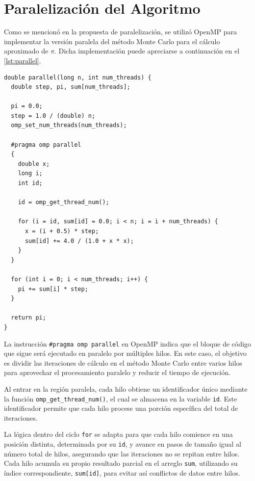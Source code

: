 \documentclass[a4paper, 10pt, onecolumn]{IEEEtran}
\begin{document}
\section{Paralelización del Algoritmo}
Como se mencionó en la propuesta de paralelización, se utilizó OpenMP para implementar la versión paralela del método Monte Carlo para el cálculo aproximado de $\pi$. Dicha implementación puede apreciarse a continuación en el \cref{lst:parallel}.

\begin{lstlisting}[caption={Implementación Paralela de Monte Carlo en C++}, label={lst:parallel}]
double parallel(long n, int num_threads) {
  double step, pi, sum[num_threads];
  
  pi = 0.0;
  step = 1.0 / (double) n;
  omp_set_num_threads(num_threads);
  
  #pragma omp parallel
  {
    double x;
    long i;
    int id;
    
    id = omp_get_thread_num();
    
    for (i = id, sum[id] = 0.0; i < n; i = i + num_threads) {
      x = (i + 0.5) * step;
      sum[id] += 4.0 / (1.0 + x * x);
    }
  }
  
  for (int i = 0; i < num_threads; i++) {
    pi += sum[i] * step;
  }
  
  return pi;
}
\end{lstlisting}

La instrucción \texttt{\#pragma omp parallel} en OpenMP indica que el bloque de código que sigue será ejecutado en paralelo por múltiples hilos. En este caso, el objetivo es dividir las iteraciones de cálculo en el método Monte Carlo entre varios hilos para aprovechar el procesamiento paralelo y reducir el tiempo de ejecución.

Al entrar en la región paralela, cada hilo obtiene un identificador único mediante la función \texttt{omp\_get\_thread\_num()}, el cual se almacena en la variable \texttt{id}. Este identificador permite que cada hilo procese una porción específica del total de iteraciones.

La lógica dentro del ciclo \texttt{for} se adapta para que cada hilo comience en una posición distinta, determinada por su \texttt{id}, y avance en pasos de tamaño igual al número total de hilos, asegurando que las iteraciones no se repitan entre hilos. Cada hilo acumula su propio resultado parcial en el arreglo \texttt{sum}, utilizando su índice correspondiente, \texttt{sum[id]}, para evitar así conflictos de datos entre hilos.
\end{document}
